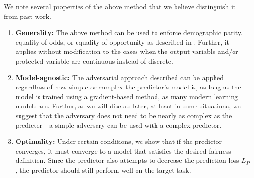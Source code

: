 \documentclass[letterpaper]{article} %
\newcommand{\incite}[1]{\citeauthor{#1} \shortcite{#1}}
\theoremstyle{definition}
\begin{document}
We note several properties of the above method that we believe distinguish it from past work.

\begin{enumerate}
\item{\bf Generality:} The above method can be used to enforce {\sc demographic parity}, {\sc equality of odds}, or {\sc equality of opportunity} as described in \incite{hardt2016equality}. Further, it applies without modification to the cases when the output variable and/or protected variable are continuous instead of discrete.

\item{\bf Model-agnostic:}  The adversarial approach described can be applied regardless of how simple or complex the predictor's model is, as long as the model is trained using a gradient-based method, as many modern learning models are. Further, as we will discuss later, at least in some situations, we suggest that the adversary does not need to be nearly as complex as the predictor---a simple adversary can be used with a complex predictor.  

\item{\bf Optimality:}  Under certain conditions, we show that if the predictor converges, it must converge to a model that satisfies the desired fairness definition. Since the predictor also attempts to decrease the prediction loss $L_P$, the predictor should still perform well on the target task.
\end{enumerate}
\end{document}
